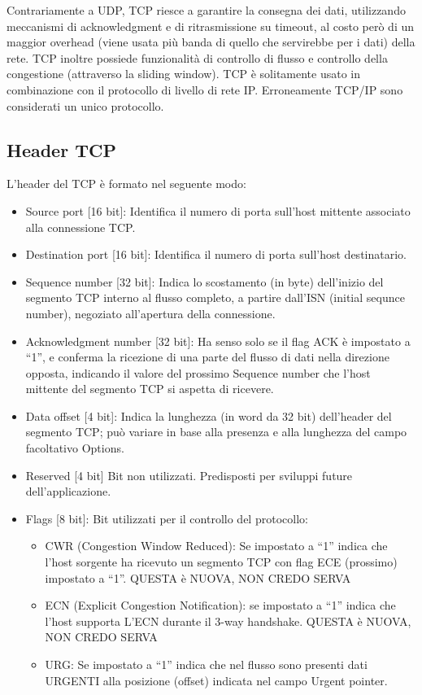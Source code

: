 Contrariamente a UDP, TCP riesce a garantire la consegna dei dati, utilizzando meccanismi di acknowledgment e di ritrasmissione su timeout, al costo però di un maggior overhead (viene usata più banda di quello che servirebbe per i dati) della rete.
TCP inoltre possiede funzionalità di controllo di flusso e controllo della congestione (attraverso la sliding window).
TCP è solitamente usato in combinazione con il protocollo di livello di rete IP. Erroneamente TCP/IP sono considerati un unico protocollo.
\subsection{Header TCP}
L'header del TCP è formato nel seguente modo:
\begin{itemize}
\item	Source port [16 bit]: Identifica il numero di porta sull'host mittente associato alla connessione TCP.
\item	Destination port [16 bit]: Identifica il numero di porta sull'host destinatario.
\item	Sequence number [32 bit]: Indica lo scostamento (in byte) dell'inizio del segmento TCP interno al flusso completo, a partire dall'ISN (initial sequnce number), negoziato all'apertura della connessione.
\item	Acknowledgment number [32 bit]: Ha senso solo se il flag ACK è impostato a “1”, e conferma la ricezione di una parte del flusso di dati nella direzione opposta, indicando il valore del prossimo Sequence number che l'host mittente del segmento TCP si aspetta di ricevere.
\item	Data offset [4 bit]: Indica la lunghezza (in word da 32 bit) dell'header del segmento TCP; può variare in base alla presenza e alla lunghezza del campo facoltativo Options.
\item	Reserved [4 bit] Bit non utilizzati. Predisposti per sviluppi future dell'applicazione.
\item	Flags [8 bit]: Bit utilizzati per il controllo del protocollo:
\begin{itemize}
\item	CWR (Congestion Window Reduced): Se impostato a “1” indica che l'host sorgente ha ricevuto un segmento TCP con flag ECE (prossimo) impostato a “1”. 
QUESTA è NUOVA, NON CREDO SERVA
\item	ECN (Explicit Congestion Notification): se impostato a “1” indica che l'host supporta L'ECN durante il 3-way handshake. QUESTA è NUOVA, NON CREDO SERVA
\item	URG: Se impostato a “1” indica che nel flusso sono presenti dati URGENTI alla posizione (offset) indicata nel campo Urgent pointer.

\end{itemize}
\end{itemize}
